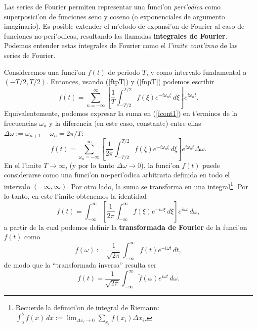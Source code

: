 Las series de Fourier permiten representar una funci'on \textit{peri'odica} como superposici'on de funciones seno y coseno (o exponenciales de argumento imaginario). Es posible extender el m'etodo de expansi'on de Fourier al caso de funciones no-peri'odicas, resultando las llamadas \textbf{integrales de Fourier}. Podemos entender estas integrales de Fourier como el \textit{l'imite cont'inuo} de las series de Fourier.

Consideremos una funci'on $f(t)$ de periodo $T$, y como intervalo fundamental a $(-T/2,T/2)$. Entonces, usando (\ref{ftpT}) y (\ref{fnpT}) podemos escribir
\begin{equation}\label{fcont1}
f(t) =\sum_{n = -\infty}^\infty\left[\frac{1}{T}\int_{-T/2}^{T/2} f(\xi) e^{-i\omega_n\xi}\, d\xi\right] e^{i\omega_nt}.
\end{equation}
Equivalentemente, podemos expresar la suma en (\ref{fcont1}) en t'erminos de la frecuencias $\omega_n$ y la diferencia (en este caso, constante) entre ellas $\Delta\omega:=\omega_{n+1}-\omega_n=2\pi/T$:
\begin{equation}
f(t) =\sum_{\omega_n = -\infty}^\infty\left[\frac{1}{2\pi}
\int_{-T/2}^{T/2} f(\xi) e^{-i\omega_n\xi}\,d\xi\right] e^{i\omega_n t}\Delta\omega.
\end{equation}
En el l'imite $T\to\infty$, (y por lo tanto $\Delta\omega\to 0$), la funci'on $f(t)$ puede considerarse como una funci'on no-peri'odica arbitraria definida en todo el intervalo $(-\infty,\infty)$. Por otro lado, la suma se transforma en una integral\footnote{Recuerde la definici'on de integral de Riemann: $\int_a^bf(x)\,dx:=\lim_{\Delta x_i\to 0}\sum_{x_i}f(x_i)\Delta x_i$.}. Por lo tanto, en este l'imite obtenemos la identidad
\begin{equation}\label{idfnp}
f(t) =\int_{-\infty}^\infty\left[\frac{1}{2\pi}\int_{-\infty}^\infty
 f(\xi) e^{-i\omega\xi}\,d\xi\right] e^{i\omega t}\,d\omega,
\end{equation}
a partir de la cual podemos definir la \textbf{transformada de Fourier} de la funci'on $f(t)$ como
\begin{equation}\label{TFf}
\boxed{\tilde{f}(\omega) :=\frac{1}{\sqrt{2\pi}}\int_{-\infty}^\infty f(t) e^{-i\omega t}\,dt,}
\end{equation}
de modo que la ``transformada inversa'' resulta ser
\begin{equation}\label{TFIf}
\boxed{f(t)=\frac{1}{\sqrt{2\pi}}\int_{-\infty}^\infty\tilde{f}(\omega) e^{i\omega t} \,d\omega.}
\end{equation}

